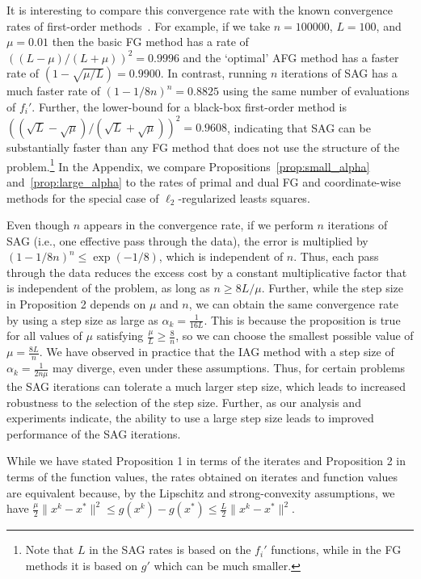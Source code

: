 \documentclass{article}
\def\norm#1{\|#1\|}
\begin{document}
  It is interesting to compare this convergence rate with the known convergence rates of first-order methods~\cite[see \S2]{nesterov2004introductory}.
For example, if we take $n=100000$, $L = 100$, and $\mu=0.01$ then the basic FG method has a rate of $((L-\mu)/(L+\mu))^2 = 0.9996$ and the `optimal' AFG method has a faster rate of $(1-\sqrt{\mu/L}) = 0.9900$.  In contrast, running $n$ iterations of SAG has a much faster rate of $(1-1/8n)^n = 0.8825$ using the same number of evaluations of $f_i'$. 
Further, the lower-bound for a black-box first-order method is $((\sqrt{L}-\sqrt{\mu})/(\sqrt{L}+\sqrt{\mu}))^2 = 0.9608$, indicating that SAG can be substantially faster than any FG method that does not use the structure of the problem.\footnote{Note that $L$ in the SAG rates is based on the $f_i'$ functions, while in the FG methods it is based on $g'$ which can be much smaller.} In the Appendix, we compare Propositions~\ref{prop:small_alpha} and~\ref{prop:large_alpha} to the rates of primal and dual FG and coordinate-wise methods for the special case of $\ell_2$-regularized leasts squares.

Even though $n$ appears in the convergence rate, if we perform $n$ iterations of SAG (i.e., one effective pass through the data), the error is multiplied by $(1 - 1/8n)^n \leq \exp(-1/8)$, which is independent of $n$. Thus, each pass through the data reduces the excess cost by a constant multiplicative factor that is independent of the problem, as long as $n \geqslant 8L/\mu$.  Further, while the step size in Proposition 2 depends on $\mu$ and $n$, we can obtain the same convergence rate by using a step size as large as $\alpha_k = \frac{1}{16L}$.  This is because the proposition is true for all values of $\mu$ satisfying $\frac{\mu}{L}\geqslant \frac{8}{n}$, so we can choose the smallest possible value of $\mu = \frac{8L}{n}$.
We have observed in practice that the IAG method with a step size of $\alpha_k = \frac{1}{2n\mu}$ may diverge, even
under these assumptions.
Thus, for certain problems the SAG iterations can tolerate a much larger step
size, which leads to increased robustness to the selection of the step size.
Further, as our analysis and experiments indicate, the ability to use a
large step size leads to improved performance of the SAG iterations.

While we have stated Proposition 1 in terms of the iterates and Proposition 2 in terms of the function values, the rates obtained on iterates and function values are equivalent because,
by the Lipschitz and strong-convexity assumptions, we have $\frac{\mu}{2}\norm{x^k-x^\ast}^2 \leqslant g(x^k) - g(x^\ast) \leqslant \frac{L}{2}\norm{x^k-x^\ast}^2$.
\end{document}
